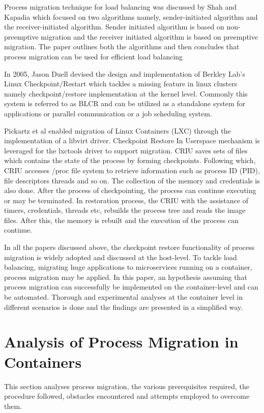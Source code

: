 \documentclass[conference]{IEEEtran}
\begin{document}
Process migration technique for load balancing was discussed by Shah and Kapadia \cite{Shah2012LoadSystem} which focused on two algorithms namely, sender-initiated algorithm and the receiver-initiated algorithm. Sender initiated algorithm is based on non-preemptive migration and the receiver initiated algorithm is based on preemptive migration. The paper outlines both the algorithms and then concludes that process migration can be used for efficient load balancing


In 2005, Jason Duell \cite{Duell2005TheBLCR} devised the design and implementation of Berkley Lab's Linux Checkpoint/Restart which tackles a missing feature in linux clusters namely checkpoint/restore implementation at the kernel level. Commonly this system is referred to as BLCR and can be utilized as a standalone system for applications or parallel communication or a job scheduling system. 


Pickartz et al \cite{Pickartz2016MigratingCRIU} enabled migration of Linux Containers (LXC) through the implementation of a libvirt driver. Checkpoint Restore In Userspace mechanism is leveraged for the lxctools driver to support migration. CRIU saves sets of files which contains the state of the process by forming checkpoints. Following which, CRIU accesses /proc file system to retrieve information such as process ID (PID), file descriptors threads and so on. The collection of the memory and credentials is also done. After the process of checkpointing, the process can continue executing or may be terminated. In restoration process, the CRIU with the assistance of timers, credentials, threads etc, rebuilds the process tree and reads the image files. After this, the memory is rebuilt and the execution of the process can continue. 

In all the papers discussed above, the checkpoint restore functionality of process migration is widely adopted and discussed at the host-level. To tackle load balancing, migrating huge applications to microservices running on a container, process migration may be applied. In this paper, an hypothesis assuming that process migration can successfully be implemented on the container-level and can be automated. Thorough and experimental analyses at the container level in different scenarios is done and the findings are presented in a simplified way. 

\section{Analysis of Process Migration in Containers}
\label{sec:3 Analysis Process Migration} 
This section analyses process migration, the various prerequisites required, the procedure followed, obstacles encountered and attempts employed to overcome them. 
\end{document}
